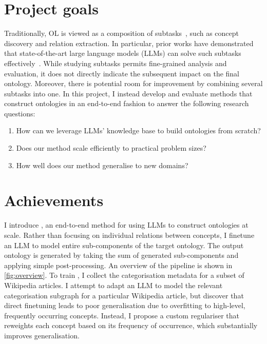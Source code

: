 \section{Project goals}

Traditionally, OL is viewed as a composition of subtasks~\cite{asim2018survey}, such as concept discovery and relation extraction. In particular, prior works have demonstrated that state-of-the-art large language models (LLMs) can solve such subtasks effectively~\cite{babaei2023llms4ol}. While studying subtasks permits fine-grained analysis and evaluation, it does not directly indicate the subsequent impact on the final ontology. Moreover, there is potential room for improvement by combining several subtasks into one. In this project, I instead develop and evaluate methods that construct ontologies in an end-to-end fashion to answer the following research questions:
\begin{enumerate}
    \item How can we leverage LLMs' knowledge base to build ontologies from scratch?
    \item Does our method scale efficiently to practical problem sizes?
    \item How well does our method generalise to new domains?
\end{enumerate}

\section{Achievements}

% 

I introduce \name, an end-to-end method for using LLMs to construct ontologies at scale. Rather than focusing on individual relations between concepts, I finetune an LLM to model entire sub-components of the target ontology. The output ontology is generated by taking the sum of generated sub-components and applying simple post-processing. An overview of the pipeline is shown in \cref{fig:overview}. To train \name, I collect the categorisation metadata for a subset of Wikipedia articles. I attempt to adapt an LLM to model the relevant categorisation subgraph for a particular Wikipedia article, but discover that direct finetuning leads to poor generalisation due to overfitting to high-level, frequently occurring concepts. Instead, I propose a custom regulariser that reweights each concept based on its frequency of occurrence, which substantially improves generalisation.

